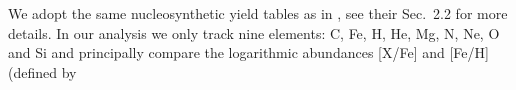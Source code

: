\documentclass{aa}
\begin{document}
%
We adopt the same nucleosynthetic yield tables as in \citep{Philcox_2019}, see their Sec.~2.2 for more details.
%
%
In our analysis we only track nine elements: C, Fe, H, He, Mg, N, Ne, O and Si and principally compare the logarithmic abundances [X/Fe] and [Fe/H] (defined by 
\end{document}
